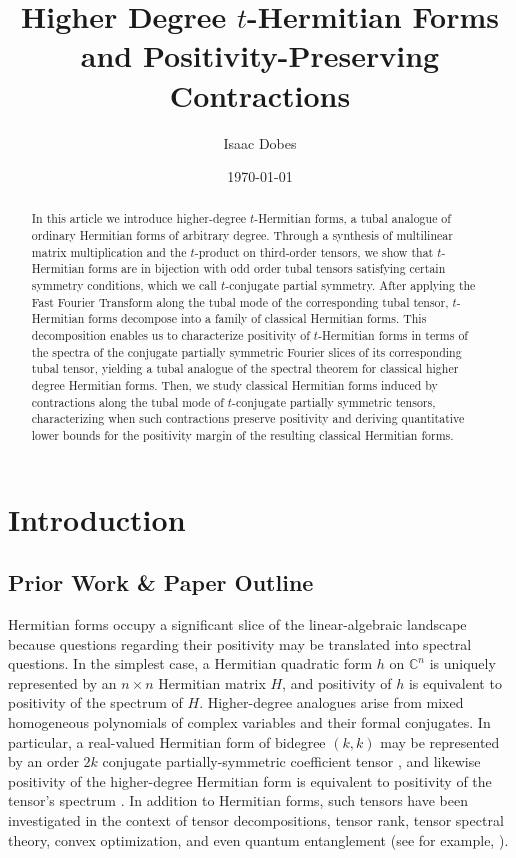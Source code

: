 \documentclass[11pt]{article}
\title{Higher Degree $t$-Hermitian Forms and Positivity-Preserving Contractions}
\author{Isaac Dobes}
\date{\today}
\begin{document}
\maketitle

\begin{abstract}
    In this article we introduce higher-degree $t$-Hermitian forms, a tubal analogue of ordinary Hermitian forms of arbitrary degree. Through a synthesis of multilinear matrix multiplication and the $t$-product on third-order tensors, we show that $t$-Hermitian forms are in bijection with odd order tubal tensors satisfying certain symmetry conditions, which we call $t$-conjugate partial symmetry. After applying the Fast Fourier Transform along the tubal mode of the corresponding tubal tensor, $t$-Hermitian forms decompose into a family of classical Hermitian forms. This decomposition enables us to characterize positivity of $t$-Hermitian forms in terms of the spectra of the conjugate partially symmetric Fourier slices of its corresponding tubal tensor, yielding a tubal analogue of the spectral theorem for classical higher degree Hermitian forms. Then, we study classical Hermitian forms induced by contractions along the tubal mode of $t$-conjugate partially symmetric tensors, characterizing when such contractions preserve positivity and deriving quantitative lower bounds for the positivity margin of the resulting classical Hermitian forms. 
\end{abstract}

\section{Introduction}
\subsection{Prior Work \& Paper Outline}
Hermitian forms occupy a significant slice of the linear-algebraic landscape because questions regarding their positivity may be translated into spectral questions. In the simplest case, a Hermitian quadratic form $h$ on $\mathbb{C}^n$ is uniquely represented by an $n\times n$ Hermitian matrix $H$, and positivity of $h$ is equivalent to positivity of the spectrum of $H$. Higher-degree analogues arise from mixed homogeneous polynomials of complex variables and their formal conjugates. In particular, a real-valued Hermitian form of bidegree $(k,k)$ may be represented by an order $2k$ conjugate partially-symmetric coefficient tensor \cite{d2011hermitian,jiang2016characterizing}, and likewise positivity of the higher-degree Hermitian form is equivalent to positivity of the tensor's spectrum \cite{chen2025hat}. In addition to Hermitian forms, such tensors have been investigated in the context of tensor decompositions, tensor rank, tensor spectral theory, convex optimization, and even quantum entanglement (see for example, \cite{ni2019hermitian,nie2020hermitian,huang2021decompositions,fu2021decompositions}). 
\end{document}
